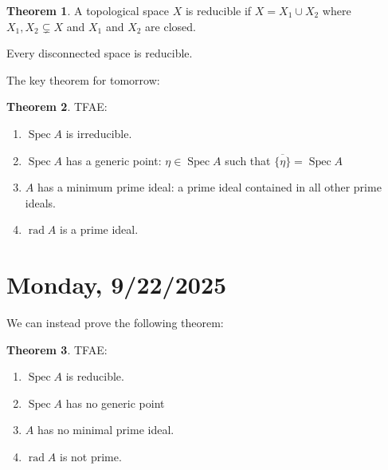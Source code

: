 \documentclass{article}
\theoremstyle{definition}
\newtheorem{theorem}{Theorem}
\begin{document}
    \begin{theorem}
        A topological space \(X\) is reducible if \(X = X_1 \cup X_2\) where \(X_1, X_2 \subsetneq X\) and \(X_1\) and \(X_2\) are closed.

        Every disconnected space is reducible.
    \end{theorem}

    The key theorem for tomorrow:

    \begin{theorem}
        TFAE:

        \begin{enumerate}[label=\arabic*)]
            \item \(\operatorname{Spec} A\) is irreducible.
            \item \(\operatorname{Spec} A\) has a generic point: \(\eta \in \operatorname{Spec} A\) such that \(\overline{\{ \eta \} } = \operatorname{Spec} A\)
            \item \(A\) has a minimum prime ideal: a prime ideal contained in all other prime ideals.
            \item \(\operatorname{rad} A\) is a prime ideal. 
        \end{enumerate} 
    \end{theorem}

    \section*{Monday, 9/22/2025}
    
    We can instead prove the following theorem:

    \begin{theorem}
        TFAE:

        \begin{enumerate}[label=\arabic*)]
            \item \(\operatorname{Spec} A\) is reducible.
            \item \(\operatorname{Spec} A\) has no generic point
            \item \(A\) has no minimal prime ideal.
            \item \(\operatorname{rad} A\) is not prime.
        \end{enumerate} 
    \end{theorem}
\end{document}
